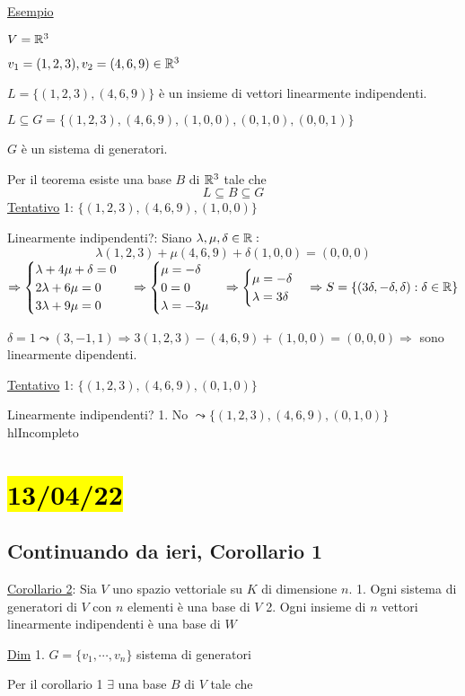 \documentclass{article}
\begin{document}
\ul{Esempio}

$V=\mathbb{R}^3$

$v_1=(1,2,3),v_2=(4,6,9)\in\mathbb{R}^3$

$L=\{(1,2,3),(4,6,9)\}$ è un insieme di vettori linearmente indipendenti.

$L\subseteq G=\{(1,2,3),(4,6,9),(1,0,0),(0,1,0),(0,0,1)\}$

$G$ è un sistema di generatori.

Per il teorema esiste una base $B$ di $\mathbb{R}^3$ tale che
$$L\subseteq B\subseteq G$$
\ul{Tentativo} 1: $\{(1,2,3),(4,6,9),(1,0,0)\}$

Linearmente indipendenti?: Siano $\lambda,\mu,\delta\in\mathbb{R}:$
$$\lambda(1,2,3)+\mu(4,6,9)+\delta(1,0,0)=(0,0,0)$$
$\Rightarrow\begin{cases}
\lambda+4\mu+\delta=0\\
2\lambda+6\mu=0\\
3\lambda+9\mu=0
\end{cases}\Rightarrow
\begin{cases}
\mu=-\delta\\
0=0\\
\lambda=-3\mu
\end{cases}\Rightarrow
\begin{cases}
\mu=-\delta\\
\lambda=3\delta
\end{cases}\Rightarrow
S=\{(3\delta,-\delta,\delta):\delta\in\mathbb{R}\}$

$\delta=1\leadsto(3,-1,1)\Rightarrow3(1,2,3)-(4,6,9)+(1,0,0)=(0,0,0)\Rightarrow$ sono linearmente dipendenti.

\ul{Tentativo} 1: $\{(1,2,3),(4,6,9),(0,1,0)\}$

Linearmente indipendenti?
1. No $\leadsto\{(1,2,3),(4,6,9),(0,1,0)\}$ hl{Incompleto}
\section{\hl{13/04/22}}
\subsection*{Continuando da ieri, Corollario 1}
\ul{Corollario 2}: Sia $V$ uno spazio vettoriale su $K$ di dimensione $n$.
1. Ogni sistema di generatori di $V$ con $n$ elementi è una base di $V$
2. Ogni insieme di $n$ vettori linearmente indipendenti è una base di $W$

\ul{Dim}
1. $G=\{v_1,\cdots,v_n\}$ sistema di generatori

    Per il corollario 1 $\exists$ una base $B$ di $V$ tale che
\end{document}

